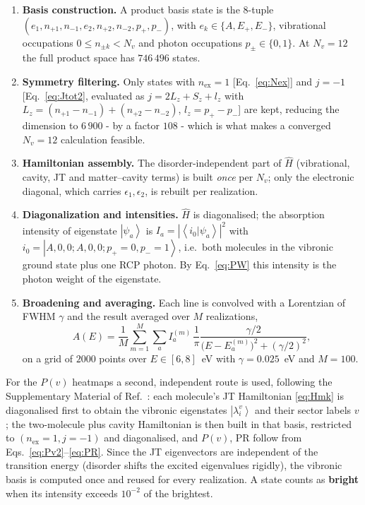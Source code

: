 \documentclass[12pt,a4paper]{article}
\newcommand{\ket}[1]{\left|#1\right\rangle}
\newcommand{\braket}[1]{\left\langle#1\right\rangle}
\newcommand{\PR}{\mathrm{PR}}
\begin{document}
\begin{enumerate}\itemsep1pt
  \item \textbf{Basis construction.} A product basis state is the 8-tuple
  $(e_1,n_{+1},n_{-1},e_2,n_{+2},n_{-2},p_+,p_-)$, with $e_k\in\{A,E_+,E_-\}$,
  vibrational occupations $0\le n_{\pm k}<N_v$ and photon occupations
  $p_\pm\in\{0,1\}$. At $N_v=12$ the full product space has $746\,496$ states.
  \item \textbf{Symmetry filtering.} Only states with $n_{\mathrm{ex}}=1$
  [Eq.~\eqref{eq:Nex}] and $j=-1$ [Eq.~\eqref{eq:Jtot2}, evaluated as
  $j=2L_z+S_z+l_z$ with $L_z=(n_{+1}-n_{-1})+(n_{+2}-n_{-2})$,
  $l_z=p_+-p_-$] are kept, reducing the dimension to $6\,900$ - by a factor
  $108$ - which is what makes a converged $N_v=12$ calculation feasible.
  \item \textbf{Hamiltonian assembly.} The disorder-independent part of
  $\hat H$ (vibrational, cavity, JT and matter--cavity terms) is built
  \emph{once} per $N_v$; only the electronic diagonal, which carries
  $\epsilon_1,\epsilon_2$, is rebuilt per realization.
  \item \textbf{Diagonalization and intensities.} $\hat H$ is diagonalised;
  the absorption intensity of eigenstate $\ket{\psi_a}$ is
  $I_a=|\braket{i_0|\psi_a}|^2$ with
  $i_0=\ket{A,0,0;A,0,0;p_+{=}0,p_-{=}1}$, i.e.\ both molecules in the
  vibronic ground state plus one RCP photon. By Eq.~\eqref{eq:PW} this
  intensity is the photon weight of the eigenstate.
  \item \textbf{Broadening and averaging.} Each line is convolved with a
  Lorentzian of FWHM $\gamma$ and the result averaged over $M$ realizations,
  \begin{equation}
    A(E)=\frac{1}{M}\sum_{m=1}^{M}\sum_a I^{(m)}_a\,
    \frac{1}{\pi}\frac{\gamma/2}{\big(E-E^{(m)}_a\big)^2+(\gamma/2)^2},
    \label{eq:spec}
  \end{equation}
  on a grid of $2000$ points over $E\in[6,8]$~eV with $\gamma=0.025$~eV and
  $M=100$.
\end{enumerate}

For the $P(v)$ heatmaps a second, independent route is used, following the
Supplementary Material of Ref.~\cite{Pandit2025}: each molecule's JT
Hamiltonian \eqref{eq:Hmk} is diagonalised first to obtain the vibronic
eigenstates $\ket{\lambda^v_i}$ and their sector labels $v$; the two-molecule
plus cavity Hamiltonian is then built in that basis, restricted to
$(n_{\mathrm{ex}}=1,j=-1)$ and diagonalised, and $P(v)$, $\PR$ follow from
Eqs.~\eqref{eq:Pv2}--\eqref{eq:PR}. Since the JT eigenvectors are independent
of the transition energy (disorder shifts the excited eigenvalues rigidly), the
vibronic basis is computed once and reused for every realization. A state
counts as \textbf{bright} when its intensity exceeds $10^{-2}$ of the
brightest.
\end{document}
